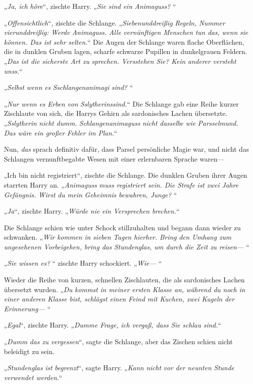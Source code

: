 {„\emph{Ja, ich höre}“, zischte Harry. „\emph{Sie sind ein} \emph{Animaguss?} “

„\emph{Offensichtlich}“, zischte die Schlange. „\emph{Siebenunddreißig Regeln, Nummer vierunddreißig: Werde} \emph{Animaguss. Alle vernünftigen Menschen tun das, wenn sie können. Das ist sehr selten.}“ Die Augen der Schlange waren flache Oberflächen, die in dunklen Gruben lagen, scharfe schwarze Pupillen in dunkelgrauen Feldern. „\emph{Das ist die sicherste Art zu sprechen. Versstehen Sie? Kein anderer versteht} \emph{unss.}“

„\emph{Selbst wenn es} \emph{Sschlangenanimagi} \emph{sind?} “

„\emph{Nur wenn es Erben von} \emph{Sslytherinssind.}“ Die Schlange gab eine Reihe kurzer Zischlaute von sich, die Harrys Gehirn als sardonisches Lachen übersetzte. „\emph{Sslytherin} \emph{nicht dumm.} \emph{Schlangenanimaguss} \emph{nicht dasselbe wie} \emph{Parsselmund. Das wäre ein großer Fehler im Plan.}“

Nun, \emph{das} sprach definitiv dafür, dass Parsel persönliche Magie war, und nicht das Schlangen vernunftbegabte Wesen mit einer erlernbaren Sprache waren—

„Ich bin nicht registriert“, zischte die Schlange. Die dunklen Gruben ihrer Augen starrten Harry an. „\emph{Animaguss} \emph{muss registriert sein. Die Strafe ist zwei Jahre Gefängnis. Wirst du mein Geheimnis bewahren, Junge?} “

„\emph{Ja}“, zischte Harry. „\emph{Würde nie ein Versprechen brechen.}“

Die Schlange schien wie unter Schock stillzuhalten und begann dann wieder zu schwanken. „\emph{Wir kommen in sieben Tagen hierher. Bring den Umhang zum ungesehenen Vorbeigehen, bring das Stundenglas, um durch die Zeit zu reisen—} “

„\emph{Sie wissen es?} “ zischte Harry schockiert. „\emph{Wie—} “

Wieder die Reihe von kurzen, schnellen Zischlauten, die als sardonisches Lachen übersetzt wurden. „\emph{Du kommst in meiner ersten Klasse an, während du noch in einer anderen Klasse bist, schlägst einen Feind mit Kuchen, zwei Kugeln der Erinnerung—} “

„\emph{Egal}“, zischte Harry. „\emph{Dumme Frage, ich vergaß, dass Sie schlau sind.}“

„\emph{Dumm das zu vergessen}“, sagte die Schlange, aber das Zischen schien nicht beleidigt zu sein.

„\emph{Stundenglas ist begrenzt}“, sagte Harry. „\emph{Kann nicht vor der neunten Stunde verwendet werden.}“

}
